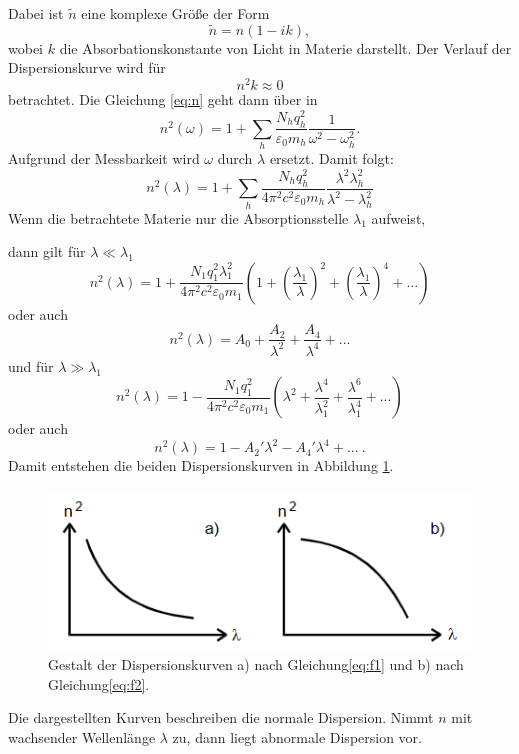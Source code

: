 Dabei ist $\tilde{n}$ eine komplexe Größe der Form
\begin{equation}
  \tilde{n} = n(1 - ik) ,
\end{equation}
wobei $k$ die Absorbationskonstante von Licht in Materie darstellt.
Der Verlauf der Dispersionskurve wird für
\begin{equation}
  n^2 k \approx 0
\end{equation}
betrachtet.
Die Gleichung \eqref{eq:n} geht dann über in
\begin{equation}
  n^2 (\omega) = 1 + \sum_{h} \frac{N_h q_h ^2}{\varepsilon_0 m_h}\frac {1}{\omega ^2 -\omega_h ^2} .
\end{equation}
Aufgrund der Messbarkeit wird $\omega$ durch $\lambda$ ersetzt.
Damit folgt:
\begin{equation}
  n^2 (\lambda) = 1 + \sum_{h} \frac{N_h q_h ^2}{4 \pi^2 c^2 \varepsilon_0 m_h}\frac{\lambda^2\lambda_h ^2}{\lambda^2 - \lambda_h ^2}
\end{equation}
Wenn die betrachtete Materie nur die Absorptionsstelle $\lambda_1$ aufweist,

\noindent dann gilt für $\lambda \ll \lambda_1$
\begin{equation}
  n^2(\lambda) = 1 + \frac{N_1 q_1 ^2 \lambda_1 ^2}{4 \pi^2 c^2 \varepsilon_0 m_1}\left(1 + \left(\frac{\lambda_1}{\lambda}\right)^2 + \left(\frac{\lambda_1}{\lambda}\right)^4 + ...\right)
\end{equation}
oder auch
\begin{equation}
  \label{eq:f1}
  n^2(\lambda) = A_0 + \frac{A_2}{\lambda^2} + \frac{A_4}{\lambda^4} + ...
\end{equation}
und für $\lambda \gg \lambda_1$
\begin{equation}
  \label{eq:b}
  n^2(\lambda) = 1 - \frac{N_1 q_1 ^2 }{4 \pi^2 c^2 \varepsilon_0 m_1}\left(\lambda^2+ \frac{\lambda^4}{\lambda_1 ^2} + \frac{\lambda^6}{\lambda_1 ^4} + ...\right) 
\end{equation}
oder auch
\begin{equation}
  \label{eq:f2}
  n^2(\lambda) = 1 - {A_2}'\lambda^2 - {A_4}'\lambda^4 + ... \: .
\end{equation}
Damit entstehen die beiden Dispersionskurven in Abbildung \ref{fig:disp}.
\begin{figure}[H]
  \centering
  \includegraphics[scale=0.6]{content/disp.png}
  \caption{Gestalt der Dispersionskurven a) nach Gleichung\eqref{eq:f1} und b) nach Gleichung\eqref{eq:f2}\cite{v402}.}
  \label{fig:disp}
\end{figure}
\noindent Die dargestellten Kurven beschreiben die normale Dispersion.
Nimmt $n$ mit wachsender Wellenlänge $\lambda$ zu, dann liegt abnormale Dispersion vor.
